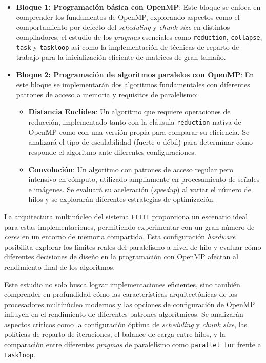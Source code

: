 \begin{itemize}

    \item \textbf{Bloque 1: Programación básica con OpenMP}: Este bloque se enfoca en comprender los fundamentos de OpenMP, explorando aspectos como el comportamiento por defecto del \textit{scheduling} y \textit{chunk size} en distintos compiladores, el estudio de los \textit{pragmas} esenciales como \texttt{reduction}, \texttt{collapse}, \texttt{task} y \texttt{taskloop} asi como la implementación de técnicas de reparto de trabajo para la inicialización eficiente de matrices de gran tamaño.

    \item \textbf{Bloque 2: Programación de algoritmos paralelos con OpenMP}: En este bloque se implementarán dos algoritmos fundamentales con diferentes patrones de acceso a memoria y requisitos de paralelismo:

    \begin{itemize}
    
        \item \textbf{Distancia Euclídea}: Un algoritmo que requiere operaciones de reducción, implementado tanto con la cláusula \texttt{reduction} nativa de OpenMP como con una versión propia para comparar su eficiencia. Se analizará el tipo de escalabilidad (fuerte o débil) para determinar cómo responde el algoritmo ante diferentes configuraciones.

        \item \textbf{Convolución}: Un algoritmo con patrones de acceso regular pero intensivo en cómputo, utilizado ampliamente en procesamiento de señales e imágenes. Se evaluará su aceleración (\textit{speedup}) al variar el número de hilos y se explorarán diferentes estrategias de optimización.
        
    \end{itemize}

\end{itemize}

La arquitectura multinúcleo del sistema \texttt{FTIII} proporciona un escenario ideal para estas implementaciones, permitiendo experimentar con un gran número de \textit{cores} en un entorno de memoria compartida. Esta configuración \textit{hardware} posibilita explorar los límites reales del paralelismo a nivel de hilo y evaluar cómo diferentes decisiones de diseño en la programación con OpenMP afectan al rendimiento final de los algoritmos.

Este estudio no solo busca lograr implementaciones eficientes, sino también comprender en profundidad cómo las características arquitectónicas de los procesadores multinúcleo modernos y las opciones de configuración de OpenMP influyen en el rendimiento de diferentes patrones algorítmicos. Se analizarán aspectos críticos como la configuración óptima de \textit{scheduling} y \textit{chunk size}, las políticas de reparto de iteraciones, el balance de carga entre hilos, y la comparación entre diferentes \textit{pragmas} de paralelismo como \texttt{parallel for} frente a \texttt{taskloop}.

